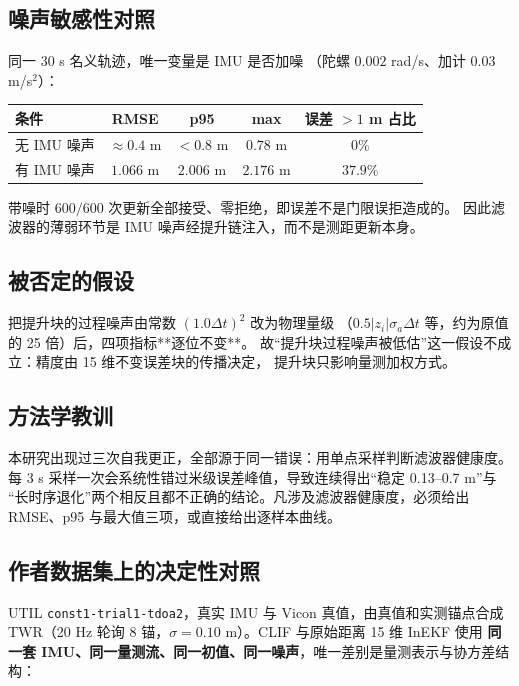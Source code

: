 \documentclass[11pt,a4paper]{ctexart}
\begin{document}
\subsection*{噪声敏感性对照}

同一 30 s 名义轨迹，唯一变量是 IMU 是否加噪
（陀螺 \(0.002\) rad/s、加计 \(0.03\) m/s\(^2\)）：

\begin{center}
\small
\begin{tabular}{lcccc}
\toprule
条件 & RMSE & p95 & max & 误差 \(>1\) m 占比 \\
\midrule
无 IMU 噪声 & \(\approx0.4\) m & \(<0.8\) m & \(0.78\) m & \(0\%\) \\
有 IMU 噪声 & \(1.066\) m & \(2.006\) m & \(2.176\) m & \(37.9\%\) \\
\bottomrule
\end{tabular}
\end{center}

带噪时 \(600/600\) 次更新全部接受、零拒绝，即误差不是门限误拒造成的。
因此滤波器的薄弱环节是 IMU 噪声经提升链注入，而不是测距更新本身。

\subsection*{被否定的假设}

把提升块的过程噪声由常数 \((1.0\Delta t)^2\) 改为物理量级
（\(0.5|z_i|\sigma_a\Delta t\) 等，约为原值的 25 倍）后，四项指标**逐位不变**。
故“提升块过程噪声被低估”这一假设不成立：精度由 15 维不变误差块的传播决定，
提升块只影响量测加权方式。

\subsection*{方法学教训}

本研究出现过三次自我更正，全部源于同一错误：用单点采样判断滤波器健康度。
每 3 s 采样一次会系统性错过米级误差峰值，导致连续得出“稳定 0.13--0.7 m”与
“长时序退化”两个相反且都不正确的结论。凡涉及滤波器健康度，必须给出
RMSE、p95 与最大值三项，或直接给出逐样本曲线。

\subsection*{作者数据集上的决定性对照}

UTIL \texttt{const1-trial1-tdoa2}，真实 IMU 与 Vicon 真值，由真值和实测锚点合成
TWR（20 Hz 轮询 8 锚，\(\sigma=0.10\) m）。CLIF 与原始距离 15 维 InEKF 使用
\textbf{同一套 IMU、同一量测流、同一初值、同一噪声}，唯一差别是量测表示与协方差结构：
\end{document}
